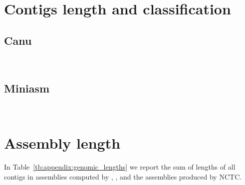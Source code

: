 \documentclass[../../main.tex]{subfiles}
\begin{document}
\newpage

\twocolumn
\section{Contigs length and classification}
\subsection*{Canu}

\newpage
~

\newpage


\subsection*{Miniasm}

\onecolumn
\newpage

~

\section{Assembly length}

In Table~\ref{tb:appendix:genomic_lengths} we report the sum of lengths of all contigs in assemblies computed by \miniasm, \canu, and the assemblies produced by NCTC.
\end{document}
